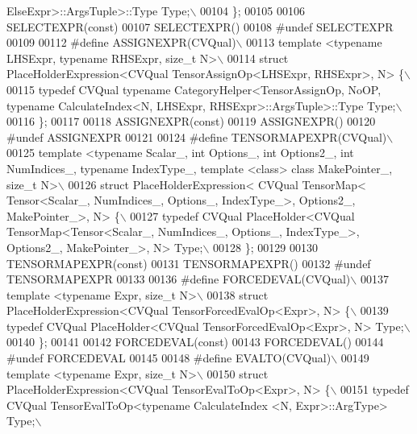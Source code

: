 \begin{DoxyCode}
{       ElseExpr>::ArgsTuple>::Type Type;\(\backslash\)}
00104 \textcolor{preprocessor}{\};}
00105 
00106 SELECTEXPR(\textcolor{keyword}{const})
00107 SELECTEXPR()
00108 \textcolor{preprocessor}{#undef SELECTEXPR}
00109 
00112 \textcolor{preprocessor}{#define ASSIGNEXPR(CVQual)\(\backslash\)}
00113 \textcolor{preprocessor}{template <typename LHSExpr, typename RHSExpr, size\_t N>\(\backslash\)}
00114 \textcolor{preprocessor}{struct PlaceHolderExpression<CVQual TensorAssignOp<LHSExpr, RHSExpr>, N> \{\(\backslash\)}
00115 \textcolor{preprocessor}{  typedef CVQual typename CategoryHelper<TensorAssignOp, NoOP, typename CalculateIndex<N, LHSExpr,
       RHSExpr>::ArgsTuple>::Type Type;\(\backslash\)}
00116 \textcolor{preprocessor}{\};}
00117 
00118 ASSIGNEXPR(\textcolor{keyword}{const})
00119 ASSIGNEXPR()
00120 \textcolor{preprocessor}{#undef ASSIGNEXPR}
00121 
00124 \textcolor{preprocessor}{#define TENSORMAPEXPR(CVQual)\(\backslash\)}
00125 \textcolor{preprocessor}{template <typename Scalar\_, int Options\_, int Options2\_, int NumIndices\_, typename IndexType\_, template
       <class> class MakePointer\_, size\_t N>\(\backslash\)}
00126 \textcolor{preprocessor}{struct PlaceHolderExpression< CVQual TensorMap< Tensor<Scalar\_, NumIndices\_, Options\_, IndexType\_>,
       Options2\_, MakePointer\_>, N> \{\(\backslash\)}
00127 \textcolor{preprocessor}{  typedef CVQual PlaceHolder<CVQual TensorMap<Tensor<Scalar\_, NumIndices\_, Options\_, IndexType\_>,
       Options2\_, MakePointer\_>, N> Type;\(\backslash\)}
00128 \textcolor{preprocessor}{\};}
00129 
00130 TENSORMAPEXPR(\textcolor{keyword}{const})
00131 TENSORMAPEXPR()
00132 \textcolor{preprocessor}{#undef TENSORMAPEXPR}
00133 
00136 \textcolor{preprocessor}{#define FORCEDEVAL(CVQual)\(\backslash\)}
00137 \textcolor{preprocessor}{template <typename Expr, size\_t N>\(\backslash\)}
00138 \textcolor{preprocessor}{struct PlaceHolderExpression<CVQual TensorForcedEvalOp<Expr>, N> \{\(\backslash\)}
00139 \textcolor{preprocessor}{  typedef CVQual PlaceHolder<CVQual TensorForcedEvalOp<Expr>, N> Type;\(\backslash\)}
00140 \textcolor{preprocessor}{\};}
00141 
00142 FORCEDEVAL(\textcolor{keyword}{const})
00143 FORCEDEVAL()
00144 \textcolor{preprocessor}{#undef FORCEDEVAL}
00145 
00148 \textcolor{preprocessor}{#define EVALTO(CVQual)\(\backslash\)}
00149 \textcolor{preprocessor}{template <typename Expr, size\_t N>\(\backslash\)}
00150 \textcolor{preprocessor}{struct PlaceHolderExpression<CVQual TensorEvalToOp<Expr>, N> \{\(\backslash\)}
00151 \textcolor{preprocessor}{  typedef CVQual TensorEvalToOp<typename CalculateIndex <N, Expr>::ArgType> Type;\(\backslash\)}

\end{DoxyCode}
